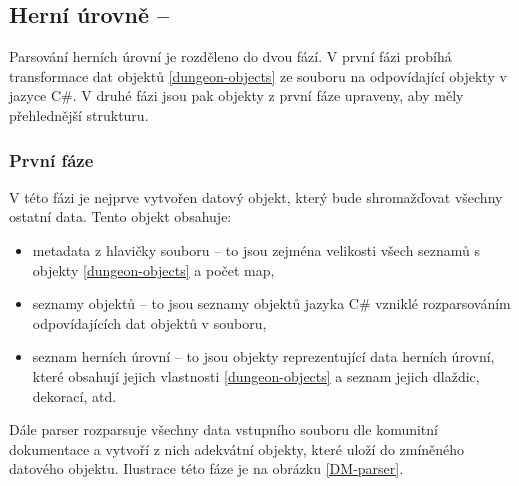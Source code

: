 
\subsection{Herní úrovně -- }\label{dungeon-parser}

Parsování herních úrovní je rozděleno do dvou fází. V první fázi probíhá transformace dat objektů \vref{dungeon-objects} ze souboru 
 na odpovídající objekty v jazyce C\#. V druhé fázi jsou pak objekty z první fáze upraveny,
aby měly přehlednější strukturu. 


\subsubsection{První fáze}

V této fázi je nejprve vytvořen datový objekt, který bude shromažďovat všechny ostatní data. Tento objekt obsahuje:

\begin{itemize}
\item metadata z hlavičky souboru -- to jsou zejména velikosti všech seznamů s objekty \vref{dungeon-objects} a počet map,
\item seznamy objektů -- to jsou seznamy objektů jazyka C\# vzniklé rozparsováním odpovídajících dat objektů v souboru,
\item seznam herních úrovní -- to jsou objekty reprezentující data herních úrovní, které obsahují jejich vlastnosti \vref{dungeon-objects}
 a seznam jejich dlaždic, dekorací, atd. 
\end{itemize}

Dále parser rozparsuje všechny data vstupního souboru dle komunitní dokumentace \cite{TechnicalDocumentationFontanel05} a vytvoří z nich 
adekvátní objekty, které uloží do zmíněného datového objektu. Ilustrace této fáze je na obrázku \ref{DM-parser}.

